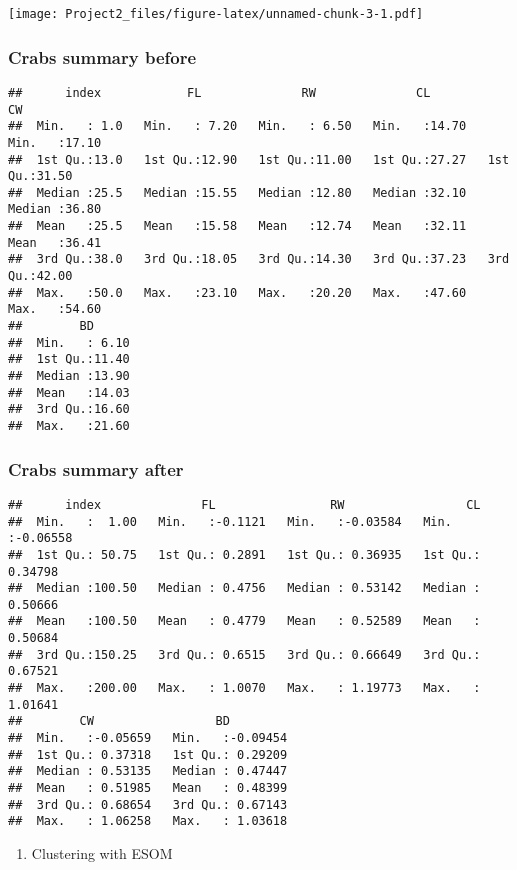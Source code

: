 \documentclass[
]{article}
\providecommand{\tightlist}{%
  \setlength{\itemsep}{0pt}\setlength{\parskip}{0pt}}
\begin{document}
\texttt{[image: Project2\_files/figure-latex/unnamed-chunk-3-1.pdf]}

\subsubsection{Crabs summary before}\label{crabs-summary-before}

\begin{verbatim}
##      index            FL              RW              CL              CW       
##  Min.   : 1.0   Min.   : 7.20   Min.   : 6.50   Min.   :14.70   Min.   :17.10  
##  1st Qu.:13.0   1st Qu.:12.90   1st Qu.:11.00   1st Qu.:27.27   1st Qu.:31.50  
##  Median :25.5   Median :15.55   Median :12.80   Median :32.10   Median :36.80  
##  Mean   :25.5   Mean   :15.58   Mean   :12.74   Mean   :32.11   Mean   :36.41  
##  3rd Qu.:38.0   3rd Qu.:18.05   3rd Qu.:14.30   3rd Qu.:37.23   3rd Qu.:42.00  
##  Max.   :50.0   Max.   :23.10   Max.   :20.20   Max.   :47.60   Max.   :54.60  
##        BD       
##  Min.   : 6.10  
##  1st Qu.:11.40  
##  Median :13.90  
##  Mean   :14.03  
##  3rd Qu.:16.60  
##  Max.   :21.60
\end{verbatim}

\subsubsection{Crabs summary after}\label{crabs-summary-after}

\begin{verbatim}
##      index              FL                RW                 CL          
##  Min.   :  1.00   Min.   :-0.1121   Min.   :-0.03584   Min.   :-0.06558  
##  1st Qu.: 50.75   1st Qu.: 0.2891   1st Qu.: 0.36935   1st Qu.: 0.34798  
##  Median :100.50   Median : 0.4756   Median : 0.53142   Median : 0.50666  
##  Mean   :100.50   Mean   : 0.4779   Mean   : 0.52589   Mean   : 0.50684  
##  3rd Qu.:150.25   3rd Qu.: 0.6515   3rd Qu.: 0.66649   3rd Qu.: 0.67521  
##  Max.   :200.00   Max.   : 1.0070   Max.   : 1.19773   Max.   : 1.01641  
##        CW                 BD          
##  Min.   :-0.05659   Min.   :-0.09454  
##  1st Qu.: 0.37318   1st Qu.: 0.29209  
##  Median : 0.53135   Median : 0.47447  
##  Mean   : 0.51985   Mean   : 0.48399  
##  3rd Qu.: 0.68654   3rd Qu.: 0.67143  
##  Max.   : 1.06258   Max.   : 1.03618
\end{verbatim}

\begin{enumerate}
\def\labelenumi{\arabic{enumi}.}
\setcounter{enumi}{1}
\tightlist
\item
  Clustering with ESOM
\end{enumerate}
\end{document}
